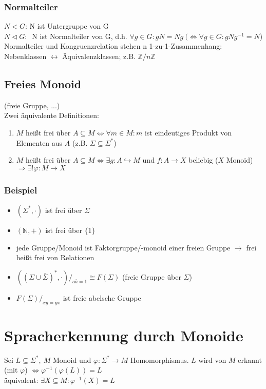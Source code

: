         \subsubsection{Normalteiler}
            $N<G$: N ist Untergruppe von G\\
            $N\triangleleft G:\ $
            N ist Normalteiler von G, d.h. $\forall g\in G : gN=Ng\ (\Leftrightarrow \forall g\in G : gNg^{-1}=N$)\\
            Normalteiler und Kongruenzrelation stehen n 1-zu-1-Zusammenhang: Nebenklassen $\leftrightarrow$ Äquivalenzklassen; z.B. $\mathds{Z}/n\mathds{Z}$
    \subsection{Freies Monoid}
        (freie Gruppe, ...)\\
        Zwei äquivalente Definitionen:
        \begin{enumerate}
            \item $M$ heißt frei über $A\subseteq M\Leftrightarrow \forall m\in M: m$ ist eindeutiges Produkt von Elementen aus $A$ (z.B. $\Sigma\subseteq\Sigma^*$)
            \item $M$ heißt frei über $A\subseteq M\Leftrightarrow \exists g:A\hookrightarrow M$ und $f:A\rightarrow X$ beliebig ($X$ Monoid) $\Rightarrow \exists!\varphi:M\rightarrow X$
        \end{enumerate}
        \subsubsection{Beispiel}
            \begin{itemize}
                \item $(\Sigma^*,\cdot)$ ist frei über $\Sigma$
                \item $(\mathds{N},+)$ ist frei über $\{1\}$
                \item jede Gruppe/Monoid ist Faktorgruppe/-monoid einer freien Gruppe $\rightarrow$ frei heißt frei von Relationen
                \item $\left(\left(\Sigma\cup\bar{\Sigma}\right)^*,\cdot \right)/_{a\bar{a}=1}\cong F(\Sigma)$ (freie Gruppe über $\Sigma$)
                \item $F(\Sigma)/_{xy=yx}$ ist freie abelsche Gruppe
            \end{itemize}
\section{Spracherkennung durch Monoide}
    Sei $L\subseteq\Sigma^*,\ M$ Monoid und $\varphi:\Sigma^*\rightarrow M$ Homomorphismus. $L$ wird von $M$ erkannt (mit $\varphi$) $\Leftrightarrow \varphi^{-1}\left(\varphi(L)\right)=L$\\
    äquivalent: $\exists X\subseteq M: \varphi^{-1}(X)=L$
